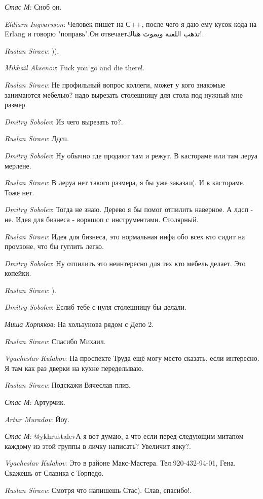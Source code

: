 \documentclass[10pt]{book}
\newcommand{\AUTHOR}[1]{\emph{#1}:}
\begin{document}
\AUTHOR{Стас М} Сноб он.

\AUTHOR{Eldjarn Ingvarsson} Человек пишет на С++, после чего я даю ему кусок кода на Erlang и говорю "поправь".Он отвечаетتذهب اللعنة ويموت هناك!.

\AUTHOR{Ruslan Siraev} )).

\AUTHOR{Mikhail Aksenov} Fuck you go and die there!.

\AUTHOR{Ruslan Siraev} Не профильный вопрос коллеги, может у кого знакомые занимаются мебелью? надо вырезать столешницу для стола под нужный мне размер.

\AUTHOR{Dmitry Sobolev} Из чего вырезать то?.

\AUTHOR{Ruslan Siraev} Лдсп.

\AUTHOR{Dmitry Sobolev} Ну обычно где продают там и режут. В кастораме или там леруа мерлене.

\AUTHOR{Ruslan Siraev} В леруа нет такого размера, я бы уже заказал(. И в кастораме. Тоже нет.

\AUTHOR{Dmitry Sobolev} Тогда не знаю. Дерево я бы помог отпилить наверное. А лдсп - не. Идея для бизнеса - воркшоп с инструментами. Столярный.

\AUTHOR{Ruslan Siraev} Идея для бизнеса, это нормальная инфа обо всех кто сидит на промзоне, что бы гуглить легко.

\AUTHOR{Dmitry Sobolev} Ну отпилить это неинтересно для тех кто мебель делает. Это копейки.

\AUTHOR{Ruslan Siraev} ).

\AUTHOR{Dmitry Sobolev} Еслиб тебе с нуля столешницу бы делали.

\AUTHOR{Миша Хорпяков} На хользунова рядом с Депо 2.

\AUTHOR{Ruslan Siraev} Спасибо Михаил.

\AUTHOR{Vyacheslav Kulakov} На проспекте Труда ещё могу место сказать, если интересно. Я там как раз дверки на кухне переделываю.

\AUTHOR{Ruslan Siraev} Подскажи Вячеслав плиз.

\AUTHOR{Стас М} Артурчик.

\AUTHOR{Artur Muradov} Йоу.

\AUTHOR{Стас М} @ykhrustalevА я вот думаю, а что если перед следующим митапом каждому из этой группы в личку написать? Увеличит явку?.

\AUTHOR{Vyacheslav Kulakov} Это в районе Макс-Мастера. Тел.920-432-94-01, Гена. Скажешь от Славика с Торпедо.

\AUTHOR{Ruslan Siraev} Смотря что напишешь Стас). Слав, спасибо!.
\end{document}
